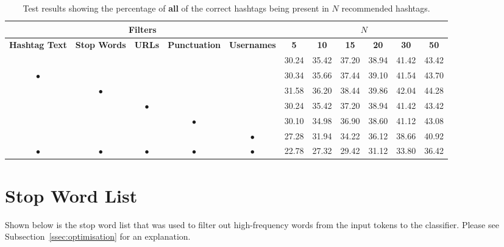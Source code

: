 \documentclass[11pt,a4paper]{report}
\begin{document}
\begin{subappendices}
\begin{landscape}
\begin{table}[H]
    \centering
    \small
    \begin{tabular}{|c|c|c|c|c||c|c|c|c|c|c|}
        \hline
        \multicolumn{5}{|c||}{Filters} & \multicolumn{6}{|c|}{$N$} \\
        \hline
        \textbf{Hashtag Text} & \textbf{Stop Words} & \textbf{URLs} & \textbf{Punctuation} & \textbf{Usernames} & \textbf{5} & \textbf{10} & \textbf{15} & \textbf{20} & \textbf{30} & \textbf{50} \\
        \hline
        \hline
        & & & & & 30.24 & 35.42 & 37.20 & 38.94 & 41.42 & 43.42 \\
        \hline
        $\bullet$ & & & & & 30.34 & 35.66 & 37.44 & 39.10 & 41.54 & 43.70 \\
        \hline
        & $\bullet$ & & & & 31.58 & 36.20 & 38.44 & 39.86 & 42.04 & 44.28 \\
        \hline
        & & $\bullet$ & & & 30.24 & 35.42 & 37.20 & 38.94 & 41.42 & 43.42 \\
        \hline
        & & & $\bullet$ & & 30.10 & 34.98 & 36.90 & 38.60 & 41.12 & 43.08 \\
        \hline
        & & & & $\bullet$ & 27.28 & 31.94 & 34.22 & 36.12 & 38.66 & 40.92 \\
        \hline
        $\bullet$ & $\bullet$ & $\bullet$ & $\bullet$ & $\bullet$ & 22.78 & 27.32 & 29.42 & 31.12 & 33.80 & 36.42 \\
        \hline
    \end{tabular}
    \caption*{Test results showing the percentage of \textbf{all} of the correct hashtags being present in $N$ recommended hashtags.}
\end{table}
\end{landscape}
\pagebreak

\section{Stop Word List}
\label{appendix:stopwords}
Shown below is the stop word list that was used to filter out high-frequency words from the input tokens to the classifier. Please see Subsection~\ref{ssec:optimisation} for an explanation.


\end{subappendices}
\end{document}

